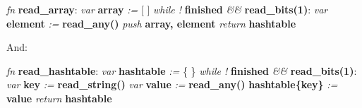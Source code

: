 \begin{changemargin}{-60mm}{0mm}
\begin{myquote}

\vbox{
\textit{fn} \textbf{read\_array}: \newline
\indent\hspace{.5cm} \textit{var} \textbf{array} \textit{:=} [ ] \newline
\indent\hspace{.5cm} \textit{while !} \textbf{finished} \textit{\&\&} \textbf{read\_bits(1)}: \newline
\indent\hspace{1cm} \textit{var} \textbf{element} \textit{:=} \textbf{read\_any()} \newline
\indent\hspace{1cm} \textit{push} \textbf{array, element} \newline
\indent\hspace{.5cm} \textit{return} \textbf{hashtable} \newline
}

\end{myquote}
\end{changemargin}

And:

\begin{changemargin}{-60mm}{0mm}
\begin{myquote}

\vbox{
\textit{fn} \textbf{read\_hashtable}: \newline
\indent\hspace{.5cm} \textit{var} \textbf{hashtable} \textit{:=} \{ \} \newline
\indent\hspace{.5cm} \textit{while !} \textbf{finished} \textit{\&\&} \textbf{read\_bits(1)}: \newline
\indent\hspace{1cm} \textit{var} \textbf{key} \textit{:=} \textbf{read\_string()} \newline
\indent\hspace{1cm} \textit{var} \textbf{value} \textit{:=} \textbf{read\_any()} \newline
\indent\hspace{1cm} \textbf{hashtable\{key\}} \textit{:=} \textbf{value} \newline
\indent\hspace{.5cm} \textit{return} \textbf{hashtable} \newline
}

\end{myquote}
\end{changemargin}

